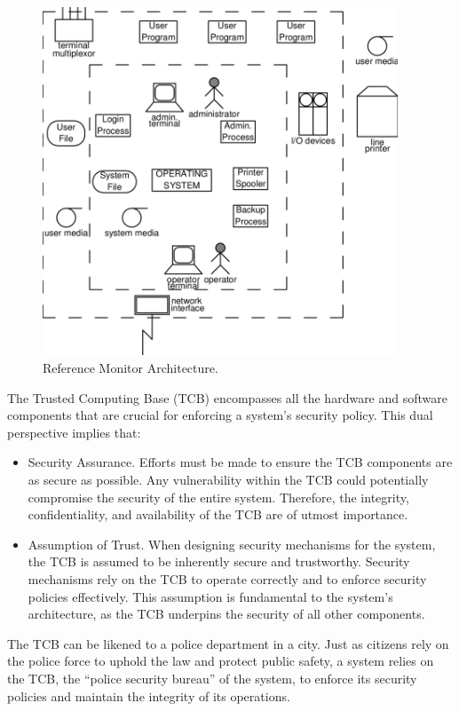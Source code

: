 \begin{figure}[htbp]
	\centering
	\includegraphics[width=300pt]{chapters/ch-computer-security-basics/figures/system_boundary.png}
	\caption{Reference Monitor Architecture.} \label{ch:ossec:fig:system_boundary}
\end{figure}

The Trusted Computing Base (TCB) encompasses all the hardware and software components that are crucial for enforcing a system's security policy. This dual perspective implies that:

\begin{itemize}
	\item Security Assurance. Efforts must be made to ensure the TCB components are as secure as possible. Any vulnerability within the TCB could potentially compromise the security of the entire system. Therefore, the integrity, confidentiality, and availability of the TCB are of utmost importance.
	\item Assumption of Trust. When designing security mechanisms for the system, the TCB is assumed to be inherently secure and trustworthy. Security mechanisms rely on the TCB to operate correctly and to enforce security policies effectively. This assumption is fundamental to the system's architecture, as the TCB underpins the security of all other components.
\end{itemize}

The TCB can be likened to a police department in a city. Just as citizens rely on the police force to uphold the law and protect public safety, a system relies on the TCB, the ``police security bureau'' of the system, to enforce its security policies and maintain the integrity of its operations.

